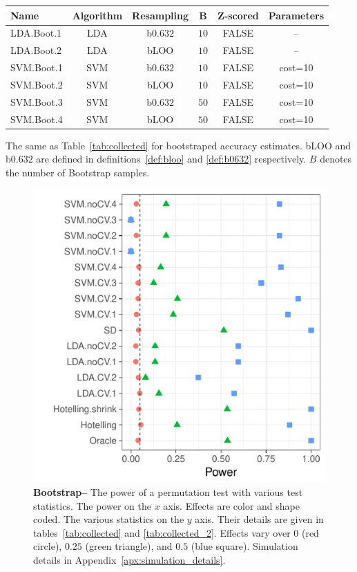 \documentclass[12pt,a4paper]{article}
\begin{document}
\bigskip

\begin{tcolorbox}
	\centering
	\begin{tabular}{l|c|c|c|c|c}
		Name & Algorithm & Resampling & B & Z-scored & Parameters\\ 
		\hline
		\hline
		LDA.Boot.1 & LDA & b$0.632$ & $10$ & FALSE &  -- \\ 
		LDA.Boot.2 & LDA & bLOO 	& $10$ & FALSE &  -- \\ 
		SVM.Boot.1 & SVM & b$0.632$ & $10$ & FALSE & cost=10 \\ 
		SVM.Boot.2 & SVM & bLOO 	& $10$ & FALSE & cost=10 \\ 
		SVM.Boot.3 & SVM & b$0.632$ & $50$ & FALSE & cost=10 \\ 
		SVM.Boot.4 & SVM & bLOO 	& $50$ & FALSE & cost=10 \\ 
	\end{tabular} 
	\captionsetup{type=table}
	\caption{
		The same as Table~\ref{tab:collected} for bootstraped accuracy estimates. 
		bLOO and b$0.632$ are defined in definitions~\ref{def:bloo} and \ref{def:b0632} respectively.
		$B$ denotes the number of Bootstrap samples. } 
	\label{tab:collected_2}
\end{tcolorbox}


\begin{figure}[ht]
	\centering
	\includegraphics[width=0.7\linewidth]{"art/file13"}
	\caption{
		\textbf{Bootstrap--}
		The power of a permutation test with various test statistics. 
		The power on the $x$ axis. 
		Effects are color and shape coded. 
		The various statistics on the $y$ axis. 
		Their details are given in tables~\ref{tab:collected} and \ref{tab:collected_2}. 
		Effects vary over $0$ (red circle), $0.25$ (green triangle), and $0.5$ (blue square). 
		Simulation details in Appendix~\ref{apx:simulation_details}.
	} 
	\label{fig:bootstrap}
\end{figure}
\end{document}
